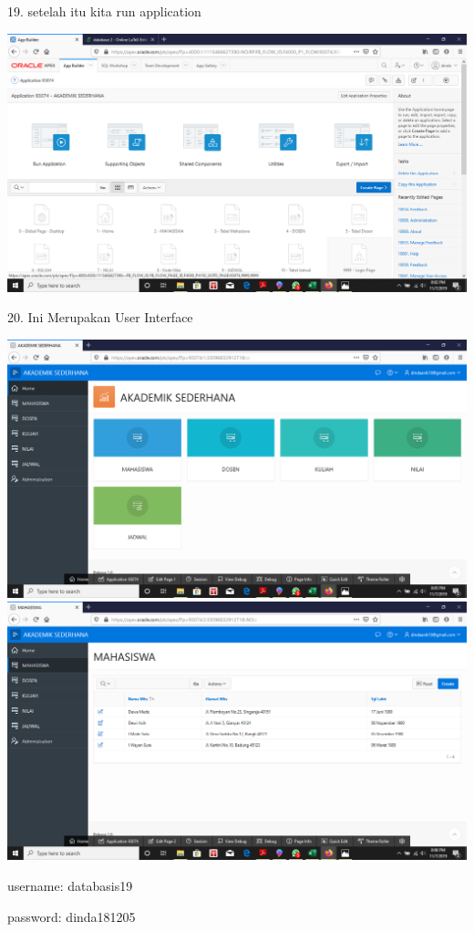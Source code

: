 \documentclass{article}
\begin{document}
\item 19. setelah itu kita run application
\begin{center}
 \includegraphics[width=10cm\textwidth]{gambar/20.png}
\end{center}
\item 20. Ini Merupakan User Interface
\begin{center}
 \includegraphics[width=10cm\textwidth]{gambar/21.png}
  \includegraphics[width=10cm\textwidth]{gambar/23.png}
\end{center}
\item username: databasis19
\item password: dinda181205
\end{document}
